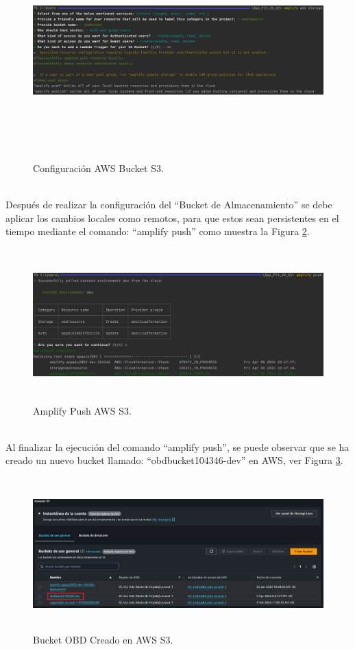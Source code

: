 \documentclass[a4paper,10pt, oneside, titlepage]{article}
\begin{document}
	\begin{figure}[!h]
		\centering
		\includegraphics[width = 1\linewidth, height = 8.4cm]{Configuracion_AWS_Bucket_S3.png}
		\caption{Configuración AWS Bucket S3.}
		\label{Configuracion_AWS_Bucket_S3}
	\end{figure} \\
	\indent Después de realizar la configuración del ``Bucket de Almacenamiento'' se debe aplicar los cambios locales como remotos, para que estos sean persistentes en el tiempo mediante el comando: ``amplify push'' como muestra la Figura \ref{Amplify_Push_AWS_S3}.
	\begin{figure}[!h]
		\centering
		\includegraphics[width = 1\linewidth, height = 5.9cm]{Amplify_Push_AWS_S3.png}
		\caption{Amplify Push AWS S3.}
		\label{Amplify_Push_AWS_S3}
	\end{figure} \\
	\indent Al finalizar la ejecución del comando ``amplify push'', se puede observar que se ha creado un nuevo bucket llamado: 
	``obdbucket104346-dev'' en AWS, ver Figura \ref{Bucket_S3_Creado_OBD}.
	\begin{figure}[!h]
		\centering
		\includegraphics[width = 1\linewidth, height = 5.9cm]{Bucket_S3_Creado_OBD.png}
		\caption{Bucket OBD Creado en AWS S3.}
		\label{Bucket_S3_Creado_OBD}
	\end{figure}
\end{document}
